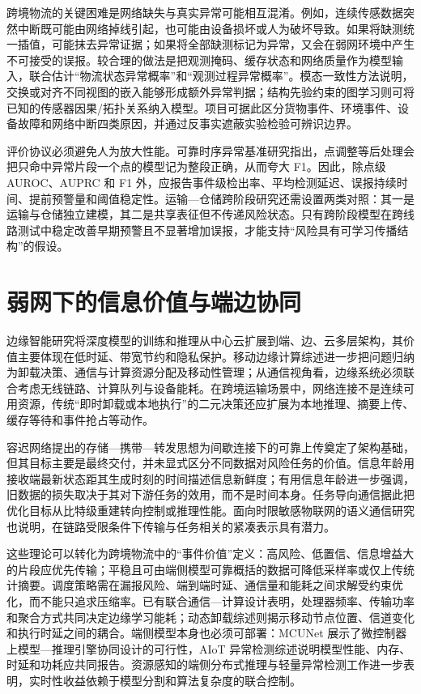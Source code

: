 \documentclass[UTF8,12pt,a4paper]{ctexart}
\begin{document}
跨境物流的关键困难是网络缺失与真实异常可能相互混淆。例如，连续传感数据突然中断既可能由网络掉线引起，也可能由设备损坏或人为破坏导致。如果将缺测统一插值，可能抹去异常证据；如果将全部缺测标记为异常，又会在弱网环境中产生不可接受的误报。较合理的做法是把观测掩码、缓存状态和网络质量作为模型输入，联合估计“物流状态异常概率”和“观测过程异常概率”。模态一致性方法说明，交换或对齐不同视图的嵌入能够形成额外异常判据\cite{extadembeddingexchange2024}；结构先验约束的图学习则可将已知的传感器因果/拓扑关系纳入模型\cite{fusiongraphstructure2024}。项目可据此区分货物事件、环境事件、设备故障和网络中断四类原因，并通过反事实遮蔽实验检验可辨识边界。

评价协议必须避免人为放大性能。可靠时序异常基准研究指出，点调整等后处理会把只命中异常片段一个点的模型记为整段正确，从而夸大 F1\cite{theelephantin2024}。因此，除点级 AUROC、AUPRC 和 F1 外，应报告事件级检出率、平均检测延迟、误报持续时间、提前预警量和阈值稳定性。运输—仓储跨阶段研究还需设置两类对照：其一是运输与仓储独立建模，其二是共享表征但不传递风险状态。只有跨阶段模型在跨线路测试中稳定改善早期预警且不显著增加误报，才能支持“风险具有可学习传播结构”的假设。

\section{弱网下的信息价值与端边协同}

边缘智能研究将深度模型的训练和推理从中心云扩展到端、边、云多层架构，其价值主要体现在低时延、带宽节约和隐私保护\cite{edgeintelligencepaving2019}。移动边缘计算综述进一步把问题归纳为卸载决策、通信与计算资源分配及移动性管理\cite{mobileedgecomputing2017}；从通信视角看，边缘系统必须联合考虑无线链路、计算队列与设备能耗\cite{asurveyon2017}。在跨境运输场景中，网络连接不是连续可用资源，传统“即时卸载或本地执行”的二元决策还应扩展为本地推理、摘要上传、缓存等待和事件抢占等动作。

容迟网络提出的存储—携带—转发思想为间歇连接下的可靠上传奠定了架构基础\cite{adelaytolerant2003}，但其目标主要是最终交付，并未显式区分不同数据对风险任务的价值。信息年龄用接收端最新状态距其生成时刻的时间描述信息新鲜度\cite{ageofinformation2021}；有用信息年龄进一步强调，旧数据的损失取决于其对下游任务的效用，而不是时间本身\cite{optimizetheage2024}。任务导向通信据此把优化目标从比特级重建转向控制或推理性能\cite{taskorientedcommunication2022}。面向时限敏感物联网的语义通信研究也说明，在链路受限条件下传输与任务相关的紧凑表示具有潜力\cite{semanticcommunicationenabling2023}。

这些理论可以转化为跨境物流中的“事件价值”定义：高风险、低置信、信息增益大的片段应优先传输；平稳且可由端侧模型可靠概括的数据可降低采样率或仅上传统计摘要。调度策略需在漏报风险、端到端时延、通信量和能耗之间求解受约束优化，而不能只追求压缩率。已有联合通信—计算设计表明，处理器频率、传输功率和聚合方式共同决定边缘学习能耗\cite{energyefficientfederated2021}；动态卸载综述则揭示移动节点位置、信道变化和执行时延之间的耦合\cite{surveyoncomputation2022}。端侧模型本身也必须可部署：MCUNet 展示了微控制器上模型—推理引擎协同设计的可行性\cite{mcunettinydeep2020}，AIoT 异常检测综述说明模型性能、内存、时延和功耗应共同报告\cite{anomalydetectionbased2024}。资源感知的端侧分布式推理与轻量异常检测工作进一步表明，实时性收益依赖于模型分割和算法复杂度的联合控制\cite{resourceawarein2024,lightesdfullyautomated2023}。
\end{document}
